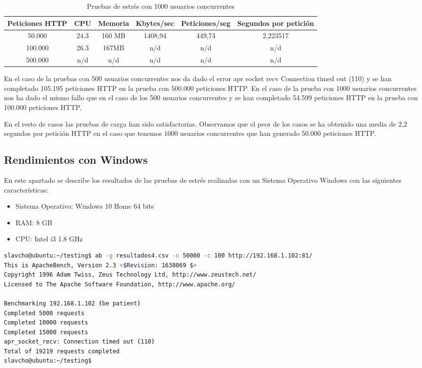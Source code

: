 \begin{table}[H]
	\begin{center}
		\begin{tabular}{|c|c|c|c|c|c|} \hline
			Peticiones HTTP & CPU & Memoria & Kbytes/sec & Peticiones/seg & Segundos por petición \\ \hline
			50.000 & 24.3 & 160 MB & 1408,94 & 449,74 & 2,223517 \\ \hline
			100.000 & 26.3 & 167MB & n/d & n/d & n/d \\ \hline
			500.000 & n/d & n/d & n/d & n/d & n/d \\ \hline
		\end{tabular}
		\caption{Pruebas de estrés con 1000 usuarios concurrentes}
		\label{tabla:MilUsuarios}
	\end{center}
\end{table}

En el caso de la pruebas con 500 usuarios concurrentes nos da dado el error apr socket recv Connection timed out (110) y se han completado 105.195 peticiones HTTP en la prueba con 500.000 peticiones HTTP. En el caso de la prueba con 1000 usuarios concurrentes nos ha dado el mismo fallo que en el caso de los 500 usuarios concurrentes y se han completado 54.599 peticiones HTTP en la prueba con 100.000 peticiones HTTP. 

En el resto de casos las pruebas de carga han sido satisfactorias. Observamos que el peor de los casos se ha obtenido una media de 2,2 segundos por petición HTTP en el caso que tenemos 1000 usuarios concurrentes que han generado 50.000 peticiones HTTP.

\subsection{Rendimientos con Windows}

En este apartado se describe los resultados de las pruebas de estrés realizadas con un Sistema Operativo Windows con las siguientes características:

\begin{itemize}
	\item Sistema Operativo: Windows 10 Home 64 bits
	\item RAM: 8 GB
	\item CPU: Intel i3 1.8 GHz
\end{itemize}

\begin{lstlisting}[language=bash]
slavcho@ubuntu:~/testing$ ab -g resultados4.csv -n 50000 -c 100 http://192.168.1.102:81/
This is ApacheBench, Version 2.3 <$Revision: 1638069 $>
Copyright 1996 Adam Twiss, Zeus Technology Ltd, http://www.zeustech.net/
Licensed to The Apache Software Foundation, http://www.apache.org/

Benchmarking 192.168.1.102 (be patient)
Completed 5000 requests
Completed 10000 requests
Completed 15000 requests
apr_socket_recv: Connection timed out (110)
Total of 19219 requests completed
slavcho@ubuntu:~/testing$
\end{lstlisting}

